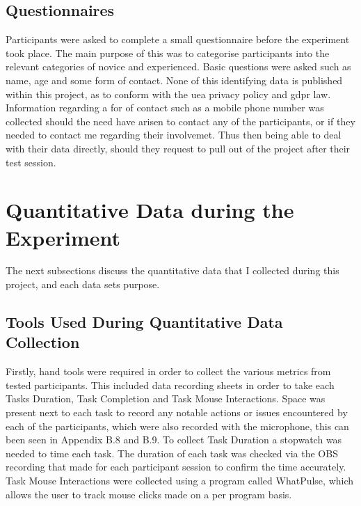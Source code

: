 \subsection{Questionnaires}
Participants were asked to complete a small questionnaire before the experiment took place. The main purpose of this was to categorise participants into the relevant categories of novice and experienced. Basic questions were asked such as name, age and some form of contact. None of this identifying data is published within this project, as to conform with the \gls{uea} privacy policy and \gls{gdpr} law. Information regarding a for of contact such as a mobile phone number was collected should the need have arisen to contact any of the participants, or if they needed to contact me regarding their involvemet. Thus then being able to deal with their data directly, should they request to pull out of the project after their test session.   


\section{Quantitative Data during the Experiment}
The next subsections discuss the quantitative data that I collected during this project, and each data sets purpose.
\subsection{Tools Used During Quantitative Data Collection}
Firstly, hand tools were required in order to collect the various metrics from tested participants. This included data recording sheets in order to take each Tasks Duration, Task Completion and Task Mouse Interactions. Space was present next to each task to record any notable actions or issues encountered by each of the participants, which were also recorded with the microphone, this can been seen in Appendix B.8 and B.9. To collect Task Duration a stopwatch was needed to time each task. The duration of each task was checked via the OBS recording that made for each participant session to confirm the time accurately. Task Mouse Interactions were collected using a program called WhatPulse, which allows the user to track mouse clicks made on a per program basis. 

